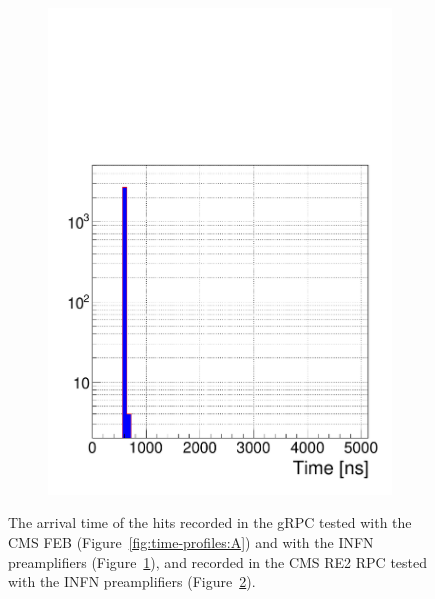 \begin{figure}[H]
\begin{subfigure}{.5\linewidth}
			\caption{\label{fig:time-profiles:B}}
		\end{subfigure}
		\begin{subfigure}{\linewidth}
		    \centering
			\includegraphics[width = .4\linewidth]{fig/chapt6/Muon-Time-Profile-RE2-INFN.pdf}
			\caption{\label{fig:time-profiles:C}}
		\end{subfigure}
		\caption{\label{fig:time-profiles} The arrival time of the hits recorded in the gRPC tested with the CMS FEB (Figure~\ref{fig:time-profiles:A}) and with the INFN preamplifiers (Figure~\ref{fig:time-profiles:B}), and recorded in the CMS RE2 RPC tested with the INFN preamplifiers (Figure~\ref{fig:time-profiles:C}).}
	\end{figure}
    
